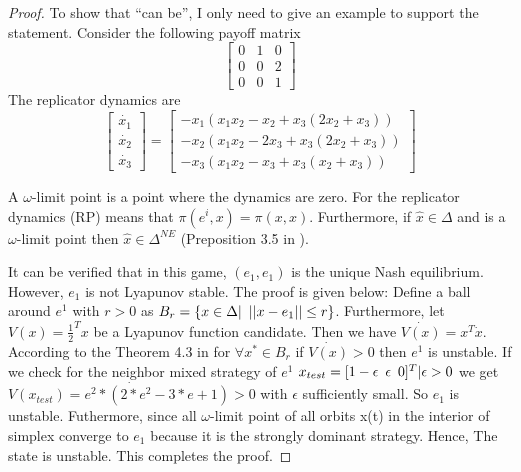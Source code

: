 \documentclass[a4 paper, 12pt]{article}
\begin{document}
\begin{proof}

To show that ``can be'', I only need to give an example to support the statement. Consider the following payoff matrix
\begin{equation}
        \left[
        \begin{array}{ccc}
        0 & 1 & 0 \\
        0 & 0 & 2 \\
        0 & 0 & 1
        \end{array}
        \right]
\end{equation}
The replicator dynamics are
\begin{equation}
        \left[
        \begin{array}{c}
        \dot{x_1} \\
        \dot{x_2} \\
        \dot{x_3} 
        \end{array}
        \right]
        =
        \left[
        \begin{array}{c}
        -x_1(x_1x_2 - x_2 + x_3(2x_2 + x_3))\\
        -x_2(x_1x_2 - 2x_3 + x_3(2x_2 + x_3))\\
        -x_3(x_1x_2 - x_3 + x_3(x_2 + x_3))
        \end{array}
        \right]
\end{equation}

A $\omega$-limit point is a point where the dynamics are zero. For the replicator dynamics (RP) means that $\pi(e^i,x) = \pi(x,x)$. Furthermore, if $\hat{x}\in \Delta$ and is a $\omega$-limit point then $\hat{x} \in \Delta^{NE}$ (Preposition 3.5 in \cite{b2}). 

It can be verified that in this game, $(e_1,e_1)$ is the unique Nash equilibrium. However, $e_1$ is not Lyapunov stable. The proof is given below: Define a ball around $e^1$ with $r>0$ as $B_r=\{x\in \Delta | \hspace{0.5em}||x-e_1|| \le r\}$. Furthermore, let $V(x)=\frac{1}{2}^Tx$ be a Lyapunov function candidate. Then we have $\dot{V(x)}=x^T\dot{x}$. According to the Theorem 4.3 in \cite{b5} for $\forall x^* \in B_r$ if $\dot{V(x)}>0$ then $e^1$ is unstable. If we check for the neighbor mixed strategy of $e^1$ $x_{test}=[1-\epsilon \hspace{0.5em} \epsilon \hspace{0.5em}0]^T | \epsilon >0$ we get $\dot{V(x_{test})=
e^2*(2*e^2 - 3*e + 1)>0}$ with $\epsilon$ sufficiently small. So $e_1$ is unstable. Futhermore, since all $\omega$-limit point of all orbits x(t) in the interior of simplex converge to $e_1$ because it is the strongly dominant strategy. Hence, The state is unstable. This completes the proof.

\end{proof}
\end{document}
